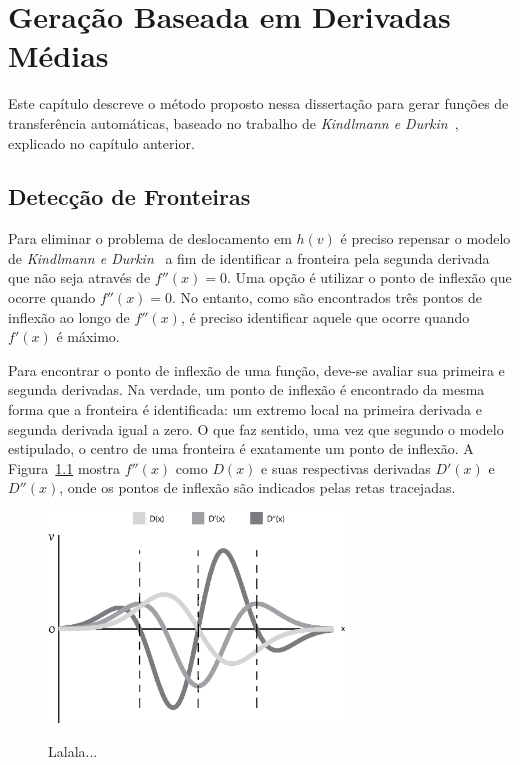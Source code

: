 
\chapter{Geração Baseada em Derivadas Médias}
\label{ch:my}
	Este capítulo descreve o método proposto nessa dissertação para gerar funções de transferência automáticas, baseado no trabalho de \textit{Kindlmann e Durkin}~\cite{gordon}, explicado no capítulo anterior.

\section{Detecção de Fronteiras}
\label{sec:my.deriv}
	Para eliminar o problema de deslocamento em $ h(v) $ é preciso repensar o modelo de \textit{Kindlmann e Durkin}~\cite{gordon} a fim de identificar a fronteira pela segunda derivada que não seja através de $ f''(x) = 0 $. Uma opção é utilizar o ponto de inflexão que ocorre quando $ f''(x) = 0 $. No entanto, como são encontrados três pontos de inflexão ao longo de $ f''(x) $, é preciso identificar aquele que ocorre quando $ f'(x) $ é máximo.
	
	Para encontrar o ponto de inflexão de uma função, deve-se avaliar sua primeira e segunda derivadas. Na verdade, um ponto de inflexão é encontrado da mesma forma que a fronteira é identificada: um extremo local na primeira derivada e segunda derivada igual a zero. O que faz sentido, uma vez que segundo o modelo estipulado, o centro de uma fronteira é exatamente um ponto de inflexão. A Figura~\ref{fig:m_inflection} mostra $ f''(x) $ como $ D(x) $ e suas respectivas derivadas $ D'(x) $ e $ D''(x) $, onde os pontos de inflexão são indicados pelas retas tracejadas.
	
\begin{figure}[h]
	\centering
	\includegraphics[width=0.7\textwidth]{images/m_inflection}
	\label{fig:m_inflection}
	\caption{Lalala...}
\end{figure}

